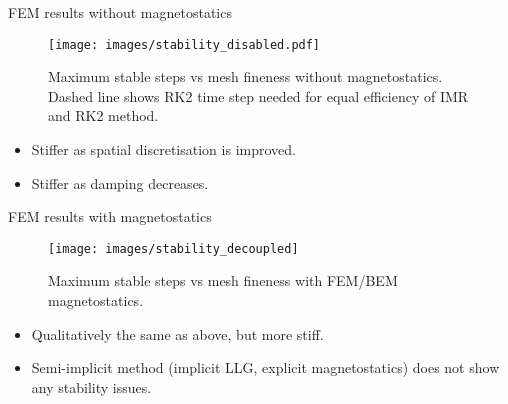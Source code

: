 \documentclass[final]{beamer} %
\newlength{\wideitemsep}
\let\olditem\item
\renewcommand{\item}{\setlength{\itemsep}{\wideitemsep}\olditem}
\begin{document}
\begin{frame}
\begin{columns}
\begin{column}{0.47\textwidth}
{        \vfill

        \begin{block}{\boxnumber FEM results without magnetostatics}
          \begin{figure}[h]
            \begin{center}
            \texttt{[image: images/stability\_disabled.pdf]}
            \label{fig:stable-step-no-ms}
            \vspace{-1.5em} %
            \caption{Maximum stable steps vs mesh fineness without magnetostatics. Dashed line shows RK2 time step needed for equal efficiency of IMR and RK2 method.}
          \end{center}

          \end{figure}
          \begin{itemize}
          \item Stiffer as spatial discretisation is improved.
          \item Stiffer as damping decreases.
          \end{itemize}
        \end{block}

        \vfill

        \begin{block}{\boxnumber FEM results with magnetostatics}
          \begin{figure}[h]
            \begin{center}
            \texttt{[image: images/stability\_decoupled]}
            \label{fig:stable-step-ms}
            \vspace{-1.5em} %
            \caption{Maximum stable steps vs mesh fineness with FEM/BEM magnetostatics.}
          \end{center}
          \end{figure}
          \begin{itemize}
          \item Qualitatively the same as above, but more stiff.
          \item Semi-implicit method (implicit LLG, explicit magnetostatics) does not show any stability issues.
          \end{itemize}
        \end{block}


}
\end{column}
\end{columns}
\end{frame}
\end{document}
